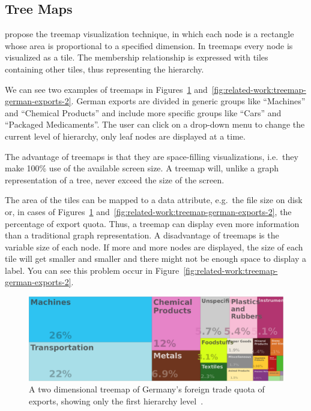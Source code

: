 \subsection{Tree Maps}
\textcite{Johnson1991} propose the treemap visualization technique, in which each node is a rectangle whose area is proportional to a specified dimension.
In treemaps every node is visualized as a tile.
The membership relationship is expressed with tiles containing other tiles, thus representing the hierarchy.

We can see two examples of treemaps in Figures~\ref{fig:related-work:treemap-german-exports-1} and~\ref{fig:related-work:treemap-german-exports-2}.
German exports are divided in generic groups like ``Machines'' and ``Chemical Products'' and include more specific groups like ``Cars'' and ``Packaged Medicaments''.
The user can click on a drop-down menu to change the current level of hierarchy, only leaf nodes are displayed at a time.

The advantage of treemaps is that they are space-filling visualizations, i.e.\ they make 100\% use of the available screen size.
A treemap will, unlike a graph representation of a tree, never exceed the size of the screen.

The area of the tiles can be mapped to a data attribute, e.g.\ the file size on disk or, in cases of Figures~\ref{fig:related-work:treemap-german-exports-1} and~\ref{fig:related-work:treemap-german-exports-2}, the percentage of export quota.
Thus, a treemap can display even more information than a traditional graph representation.
A disadvantage of treemaps is the variable size of each node.
If more and more nodes are displayed, the size of each tile will get smaller and smaller and there might not be enough space to display a label.
You can see this problem occur in Figure~\ref{fig:related-work:treemap-german-exports-2}.
\begin{figure}[ht]
    \centering
    \includegraphics[width=\textwidth]{figures/related-work/en_profile_country_deu_1}
    \caption{A two dimensional treemap of Germany's foreign trade quota of exports, showing only the first hierarchy level~\parencite{Observatory2017}.}
    \label{fig:related-work:treemap-german-exports-1}
\end{figure}

